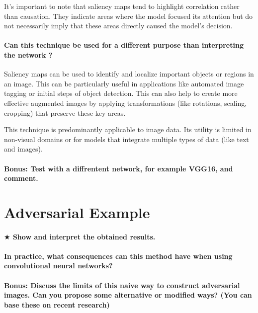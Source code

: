 It's important to note that saliency maps tend to highlight correlation rather than causation. They indicate areas where the model focused its attention but do not necessarily imply that these areas directly caused the model's decision.


\paragraph*{Can this technique be used for a different purpose than interpreting the network ?}
Saliency maps can be used to identify and localize important objects or regions in an image. This can be particularly useful in applications like automated image tagging or initial steps of object detection. This can also  help to create more effective augmented images by applying transformations (like rotations, scaling, cropping) that preserve these key areas.

This technique is predominantly applicable to image data. Its utility is limited in non-visual domains or for models that integrate multiple types of data (like text and images).


\paragraph*{\textbf{Bonus:} Test with a diffrentent network, for example VGG16, and comment.}



\section{Adversarial Example}
\paragraph*{$ \bigstar $ Show and interpret the obtained results.}
\paragraph*{In practice, what consequences can this method have when using convolutional neural networks?}
\paragraph*{\textbf{Bonus:} Discuss the limits of this naive way to construct adversarial images. Can you propose some alternative or modiﬁed ways? (You can base these on recent research)}


